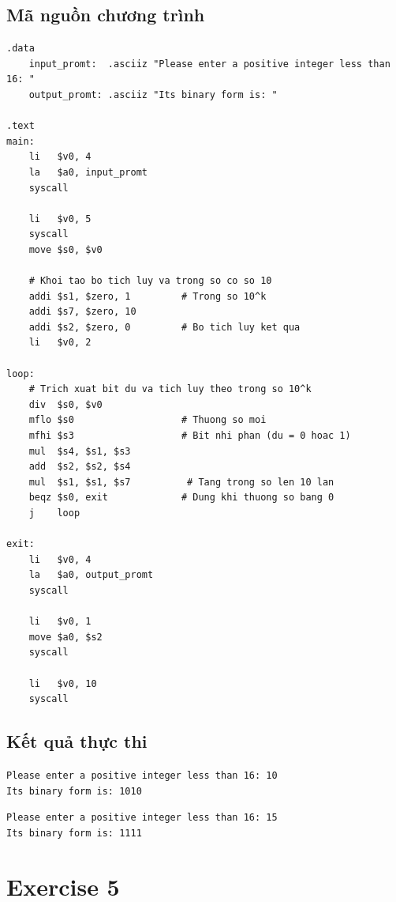 \documentclass[a4paper]{article}
\numberwithin{figure}{section}
\numberwithin{table}{section}
\begin{document}
\subsection{Mã nguồn chương trình}
\begin{lstlisting}[style=mipsstyle]
.data
    input_promt:  .asciiz "Please enter a positive integer less than 16: "
    output_promt: .asciiz "Its binary form is: "

.text
main:
    li   $v0, 4
    la   $a0, input_promt
    syscall
    
    li   $v0, 5
    syscall
    move $s0, $v0
    
    # Khoi tao bo tich luy va trong so co so 10
    addi $s1, $zero, 1         # Trong so 10^k
    addi $s7, $zero, 10
    addi $s2, $zero, 0         # Bo tich luy ket qua
    li   $v0, 2

loop:
    # Trich xuat bit du va tich luy theo trong so 10^k
    div  $s0, $v0
    mflo $s0                   # Thuong so moi
    mfhi $s3                   # Bit nhi phan (du = 0 hoac 1)
    mul  $s4, $s1, $s3
    add  $s2, $s2, $s4
    mul  $s1, $s1, $s7          # Tang trong so len 10 lan
    beqz $s0, exit             # Dung khi thuong so bang 0
    j    loop

exit:
    li   $v0, 4
    la   $a0, output_promt
    syscall
    
    li   $v0, 1
    move $a0, $s2
    syscall
    
    li   $v0, 10
    syscall
\end{lstlisting}

\subsection{Kết quả thực thi}
\begin{outputbox}
\texttt{Please enter a positive integer less than 16: 10}\\
\texttt{Its binary form is: 1010}
\end{outputbox}

\begin{outputbox}
\texttt{Please enter a positive integer less than 16: 15}\\
\texttt{Its binary form is: 1111}
\end{outputbox}

\pagebreak

\section{Exercise 5}
\end{document}
